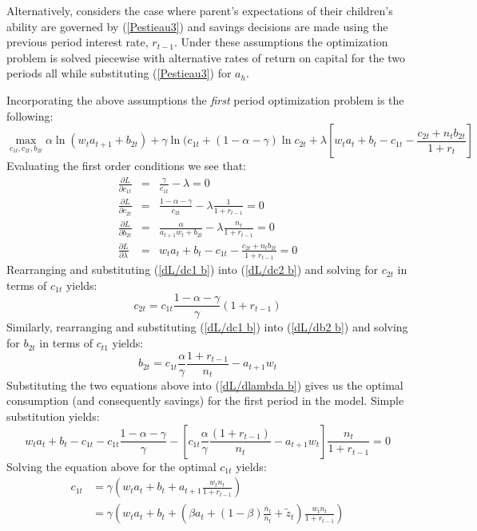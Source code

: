 \documentclass{article}
\begin{document}
Alternatively, \citet{pestieau-1984-oep} considers the case where parent's expectations of their children's ability are governed by (\ref{Pestieau3}) and savings decisions are made using the previous period interest rate, $r_{t-1}$.  Under these assumptions the optimization problem is solved piecewise with alternative rates of return on capital for the two periods all while substituting (\ref{Pestieau3}) for $a_h$.

Incorporating the above assumptions the \emph{first} period optimization problem is the following:
\begin{equation}
\max_{c_{1t}, c_{2t}, b_{2t}}\alpha \ln (w_t a_{t+1} + b_{2t})
+ \gamma \ln (c_{1t}
+ (1-\alpha-\gamma) \ln c_{2t}
+ \lambda [ w_t a_t + b_t - c_{1t} - \frac{c_{2t} + n_t b_{2t}}{1+r_t}]
\end{equation}
Evaluating the first order conditions we see that:
\begin{eqnarray}
\frac{\partial L}{\partial c_{1t}} &=& \frac{\gamma}{c_{1t}} - \lambda = 0  \label{dL/dc1 b} \\
\frac{\partial L}{\partial c_{2t}} &=& \frac{1-\alpha-\gamma}{c_{2t}}-\lambda\frac{1}{1+r_{t-1}} = 0 \label{dL/dc2 b}\\
\frac{\partial L}{\partial b_{2t}} &=& \frac{\alpha}{a_{t+1} w_t + b_{2t}} - \lambda \frac{n_t}{1+r_{t-1}} = 0 \label{dL/db2 b}\\
\frac{\partial L}{\partial \lambda} &=& w_t a_t + b_t - c_{1t} - \frac{ c_{2t}+ n_t b_{2t}} {1+r_{t-1}}  = 0 \label{dL/dlambda b}
\end{eqnarray}
Rearranging and substituting (\ref{dL/dc1 b}) into (\ref{dL/dc2 b}) and solving for $c_{2t}$ in terms of $c_{1t}$ yields:
\begin{equation}
c_{2t} = c_{1t}\frac{1-\alpha-\gamma}{\gamma}(1+r_{t-1})
\end{equation}
Similarly, rearranging and substituting (\ref{dL/dc1 b}) into (\ref{dL/db2 b}) and solving for $b_{2t}$ in terms of $c_{t1}$ yields:
\begin{equation}
b_{2t} = c_{1t} \frac{\alpha}{\gamma}\frac{1+r_{t-1}}{n_t} - a_{t+1}w_t
\end{equation}
Substituting the two equations above into (\ref{dL/dlambda b}) gives us the optimal consumption (and consequently savings) for the first period in the model. Simple substitution yields:
\begin{equation*}
w_t a_t + b_t - c_{1t} - c_{1t}\frac{1-\alpha-\gamma}{\gamma} - [c_{1t}\frac{\alpha}{\gamma}\frac{(1+r_{t-1})}{n_t}-a_{t+1}w_t]\frac{n_t}{1+r_{t-1}}=0
\end{equation*}
Solving the equation above for the optimal $c_{1t}$ yields:
\begin{equation}\label{opt c1 b}
\begin{split}
c_{1t}
&= \gamma(w_t a_t + b_t + a_{t+1}\frac{w_t n_t}{1+r_{t-1}})\\
&= \gamma(w_t a_t + b_t + (\beta a_t + (1-\beta)\frac{\overline{n}_{t}}{n_t}+\tilde{z}_t)\frac{w_t n_t}{1+r_{t-1}})
\end{split}
\end{equation}
\end{document}
